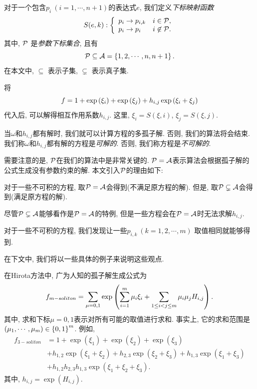 对于一个包含$p_i~(i=1,\cdots,n+1)$的表达式$e$, 我们定义\emph{下标映射函数}
\begin{equation}
    S(e,k): \left\{\begin{array}{ll}
        p_i \rightarrow p_{i,k} & i \in \mathcal{P}, \\ 
        p_i \rightarrow p_i & i \not\in \mathcal{P}.
    \end{array}\right.
\end{equation}
其中, $\mathcal{P}$ 是\emph{参数下标集合}, 且有 
\begin{equation}
    \mathcal{P}\subseteq  \mathcal{A}=\left\{1,2,\cdots,n,n+1\right\}.
\end{equation}
在本文中, $\subseteq$ 表示子集, $\subsetneq$ 表示真子集. 

将
\begin{equation}
    f=1+\exp\left(\xi_i\right)+\exp\left(\xi_j\right)+h_{i,j}\exp\left(\xi_i+\xi_j\right) \label{hij}
\end{equation}
代入后, 可以解得相互作用系数$h_{i,j}$. 这里, $\xi_i=S(\xi,i)$, $\xi_j=S(\xi,j)$.

当$\omega$和$h_{i,j}$都有解时, 我们就可以计算方程的多孤子解. 否则, 我们的算法将会结束. 我们称$\omega$和$h_{i,j}$都有解的方程是\emph{可解的}. 否则, 我们称方程是\emph{不可解的}.

需要注意的是, $\mathcal{P}$在我们的算法中是非常关键的. $\mathcal{P}= \mathcal{A}$表示算法会根据孤子解的公式生成没有参数约束的解. 本文引入$\mathcal{P}$的理由如下: 
\begin{compactenum}[1. ]
\item 对于一些不可积的方程, 取$\mathcal{P}= \mathcal{A}$会得到\emph{\FalseSol{}}(不满足原方程的解). 但是, 取$\mathcal{P}\subsetneq  \mathcal{A}$会得到\emph{\TrueSol{}}(满足原方程的解).
\item 尽管$\mathcal{P}\subsetneq  \mathcal{A}$能够看作是$\mathcal{P}= \mathcal{A}$的特例, 但是一些方程会在$\mathcal{P}= \mathcal{A}$时无法求解$h_{i,j}$.
\item 对于一些不可积的方程, 我们发现让一些$p_{i,k}~(k=1,2,\cdots,m)$ 取值相同就能够得到\TrueSol{}.
\end{compactenum}
在下文中, 我们将以一些具体的例子来说明这些观点. 

在Hirota方法中, 广为人知的孤子解生成公式为\cite{hirota1973exact}
\begin{equation}
    f_{m-soliton}=\sum_{\mu=0,1}\exp\left(\sum_{i=1}^m{\mu_i \xi_i}+\sum_{1\le i<j\le m}{\mu_i\mu_jH_{i,j}}\right). \label{f-soliton-old}
\end{equation}
其中, 求和下标$\mu=0,1$表示对所有可能的取值进行求和. 事实上, 它的求和范围是$\left(\mu_1,\cdots,\mu_m\right)\in \left\{0,1\right\}^m$. 例如, 
\begin{equation}
\begin{split}
f_{3-soliton}&=1+\exp(\xi_1)+\exp(\xi_2)+\exp(\xi_3)\\
&+h_{1,2}\exp(\xi_1+\xi_2)+h_{2,3}\exp(\xi_2+\xi_3)+h_{1,3}\exp(\xi_1+\xi_3)\\
&+h_{1,2}h_{2,3}h_{1,3}\exp(\xi_1+\xi_2+\xi_3).
\end{split}
\end{equation}
其中, $h_{i,j}=\exp(H_{i,j})$.

